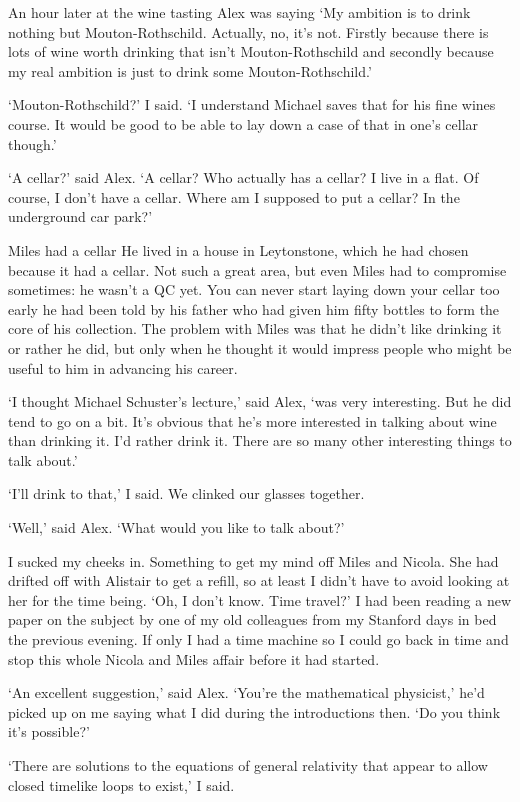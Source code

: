 An hour later at the wine tasting Alex was saying `My ambition is to drink nothing but
Mouton-Rothschild. Actually, no, it's not. Firstly because there is
lots of wine worth drinking that isn't Mouton-Rothschild and
secondly because my real ambition is just to drink some
Mouton-Rothschild.'

`Mouton-Rothschild?' I said. `I understand Michael saves that for his fine wines course. It would be good to be able to lay down a case of that in
one's cellar though.'

`A cellar?' said Alex. `A cellar? Who actually has a cellar? I live in a flat. Of
course, I don't have a cellar. Where am I supposed to put a cellar?
In the underground car park?'

Miles had a cellar He lived in a house in Leytonstone, which he had chosen because it had a cellar. Not {\twelveit such\/} a great area, but even Miles had to
compromise sometimes: he wasn't a QC yet. You can never start laying down your cellar
too early he had been told by his father who had given him fifty bottles to form  the core of his collection. The problem with Miles was that he
didn't like drinking it or rather he did, but only when he thought it would impress people who might be useful to him in advancing his career.

`I thought Michael Schuster's lecture,' said Alex, `was very interesting. But he did tend to
go on a bit. It's obvious that he's more interested in talking about
wine than drinking it. I'd rather drink it. There are so many other
interesting things to talk about.'

`I'll drink to that,' I said. We clinked our glasses together.

`Well,' said Alex. `What would you like to talk about?'

I sucked my cheeks in. Something to get my mind off Miles and Nicola. She had drifted off with Alistair to get a refill, so at least I didn't have to avoid looking at her for the time being. `Oh, I don't know. Time
travel?' I had been reading a new paper on the subject by one of my old
colleagues from my Stanford days in bed the previous evening. If only I had a time machine so I could go back in time and stop this whole Nicola and Miles affair before it had started.

`An excellent suggestion,' said Alex. `You're the mathematical physicist,' he'd picked up on me saying what I did during the introductions then. `Do you think it's possible?'

`There are solutions to the equations of general relativity that
appear to allow closed timelike loops to exist,' I said.

